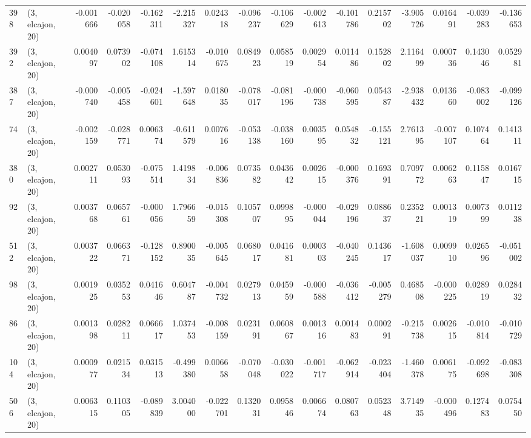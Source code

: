 \begin{tabular}{llrrrrrrrrrrrrrr}
398 &  (3, elcajon, 20) &  -0.001666 & -0.020058 & -0.162311 &   -2.215327 &  0.024318 &  -0.096237 &  -0.106629 & -0.002613 & -0.101786 &  0.215702 &   -3.905726 &  0.016491 &  -0.039283 &  -0.136653 \\
392 &  (3, elcajon, 20) &   0.004097 &  0.073902 & -0.074108 &    1.615314 & -0.010675 &   0.084923 &   0.058519 &  0.002954 &  0.011486 &  0.152802 &    2.116499 &  0.000736 &   0.143046 &   0.052981 \\
387 &  (3, elcajon, 20) &  -0.000740 & -0.005458 & -0.024601 &   -1.597648 &  0.018035 &  -0.078017 &  -0.081196 & -0.000738 & -0.060595 &  0.054387 &   -2.938432 &  0.013660 &  -0.083002 &  -0.099126 \\
74  &  (3, elcajon, 20) &  -0.002159 & -0.028771 &  0.006374 &   -0.611579 &  0.007616 &  -0.053138 &  -0.038160 &  0.003595 &  0.054832 & -0.155121 &    2.761395 & -0.007107 &   0.107464 &   0.141311 \\
380 &  (3, elcajon, 20) &   0.002711 &  0.053093 & -0.075514 &    1.419834 & -0.006836 &   0.073582 &   0.043642 &  0.002615 & -0.000376 &  0.169391 &    0.709772 &  0.006263 &   0.115847 &   0.016715 \\
92  &  (3, elcajon, 20) &   0.003768 &  0.065761 & -0.000056 &    1.796659 & -0.015308 &   0.105707 &   0.099895 & -0.000044 & -0.029196 &  0.088637 &    0.235221 &  0.001319 &   0.007399 &   0.011238 \\
512 &  (3, elcajon, 20) &   0.003722 &  0.066371 & -0.128152 &    0.890035 & -0.005645 &   0.068017 &   0.041681 &  0.000303 & -0.040245 &  0.143617 &   -1.608037 &  0.009910 &   0.026596 &  -0.051002 \\
98  &  (3, elcajon, 20) &   0.001925 &  0.035253 &  0.041646 &    0.604787 & -0.004732 &   0.027913 &   0.045959 & -0.000588 & -0.036412 & -0.005279 &    0.468508 & -0.000225 &   0.028919 &   0.028432 \\
86  &  (3, elcajon, 20) &   0.001398 &  0.028211 &  0.066617 &    1.037453 & -0.008159 &   0.023191 &   0.060867 &  0.001316 &  0.001483 &  0.000291 &   -0.215738 &  0.002615 &  -0.010814 &  -0.010729 \\
104 &  (3, elcajon, 20) &   0.000977 &  0.021534 &  0.031513 &   -0.499380 &  0.006658 &  -0.070048 &  -0.030022 & -0.001717 & -0.062914 & -0.023404 &   -1.460378 &  0.006175 &  -0.092698 &  -0.083308 \\
506 &  (3, elcajon, 20) &   0.006315 &  0.110305 & -0.089839 &    3.004000 & -0.022701 &   0.132031 &   0.095846 &  0.006674 &  0.080763 &  0.052348 &    3.714935 & -0.000496 &   0.127483 &   0.075450 \\

\end{tabular}

